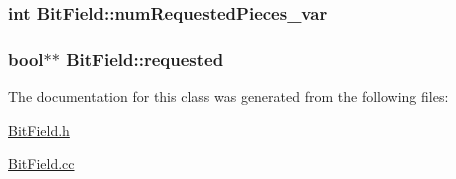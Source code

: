 \subsubsection[{num\+Requested\+Pieces\+\_\+var}]{\setlength{\rightskip}{0pt plus 5cm}int Bit\+Field\+::num\+Requested\+Pieces\+\_\+var\hspace{0.3cm}{\ttfamily [protected]}}\label{classBitField_a61c4e98def318eb51962e05277eda15b}
\hypertarget{classBitField_a47a55c1562e21daa9c9712da2158800c}{}
\subsubsection[{requested}]{\setlength{\rightskip}{0pt plus 5cm}bool$\ast$$\ast$ Bit\+Field\+::requested\hspace{0.3cm}{\ttfamily [protected]}}\label{classBitField_a47a55c1562e21daa9c9712da2158800c}


The documentation for this class was generated from the following files\+:\begin{DoxyCompactItemize}
\item 
\hyperlink{BitField_8h}{Bit\+Field.\+h}\item 
\hyperlink{BitField_8cc}{Bit\+Field.\+cc}\end{DoxyCompactItemize}
